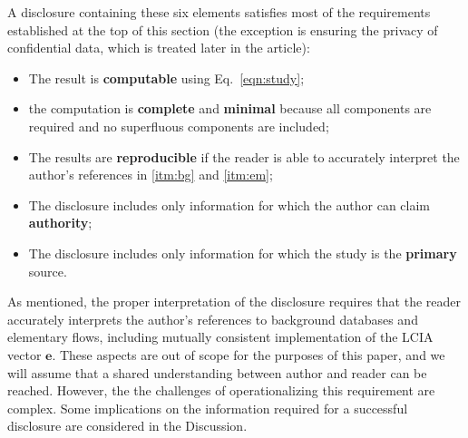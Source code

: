 A disclosure containing these six elements satisfies most of the requirements established at the top of this section (the exception is ensuring the privacy of confidential data, which is treated later in the article):
\begin{itemize}
  \item The result is \textbf{computable} using Eq.~\ref{eqn:study};
  \item the computation is \textbf{complete} and \textbf{minimal} because all components are required and no superfluous components are included;
  \item The results are \textbf{reproducible} if the reader is able to accurately interpret the author's references in \ref{itm:bg} and \ref{itm:em};
  \item The disclosure includes only information for which the author can claim \textbf{authority};
  \item The disclosure includes only information for which the study is the \textbf{primary} source.
\end{itemize}
As mentioned, the proper interpretation of the disclosure requires that the reader accurately interprets the author's references to background databases and elementary flows, including mutually consistent implementation of the LCIA vector $\mathbf{e}$.  These aspects are out of scope for the purposes of this paper, and we will assume that a shared understanding between author and reader can be reached.  However, the the challenges of operationalizing this requirement are complex.  Some implications on the information required for a successful disclosure are considered in the Discussion.

